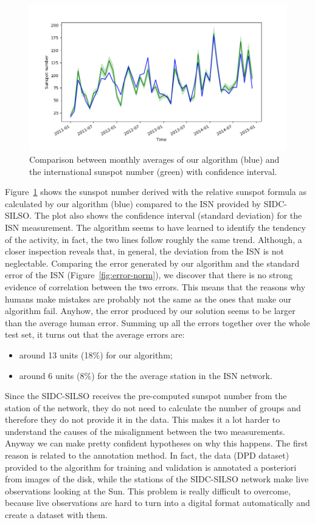 \bigbreak
\begin{figure}[t!]
  \centering
  \captionsetup{justification=centering}
  \includegraphics[width=\textwidth]{./pictures/result-monthly-3}
  \caption{Comparison between monthly averages of our algorithm (blue) and the international sunspot number (green) with confidence interval.}
  \label{fig:result-monthly-3}
\end{figure}
\noindent Figure~\ref{fig:result-monthly-3} shows the sunspot number derived with the relative sunspot formula as calculated by our algorithm (blue) compared to the ISN provided by SIDC-SILSO. The plot also shows the confidence interval (standard deviation) for the ISN measurement. The algorithm seems to have learned to identify the tendency of the activity, in fact, the two lines follow roughly the same trend. Although, a closer inspection reveals that, in general, the deviation from the ISN is not neglectable.
\bigbreak
\noindent Comparing the error generated by our algorithm and the standard error of the ISN (Figure~\ref{fig:error-norm}), we discover that there is no strong evidence of correlation between the two errors. This means that the reasons why humans make mistakes are probably not the same as the ones that make our algorithm fail. Anyhow, the error produced by our solution seems to be larger than the average human error. Summing up all the errors together over the whole test set, it turns out that the average errors are:
\begin{itemize}
  \item around 13 units (18\%) for our algorithm;
  \item around 6 units (8\%) for the the average station in the ISN network.
\end{itemize}
\bigbreak
\noindent Since the SIDC-SILSO receives the pre-computed sunspot number from the station of the network, they do not need to calculate the number of groups and therefore they do not provide it in the data. This makes it a lot harder to understand the causes of the misalignment between the two measurements. Anyway we can make pretty confident hypotheses on why this happens. The first reason is related to the annotation method. In fact, the data (DPD dataset) provided to the algorithm for training and validation is annotated a posteriori from images of the disk, while the stations of the SIDC-SILSO network make live observations looking at the Sun. This problem is really difficult to overcome, because live observations are hard to turn into a digital format automatically and create a dataset with them.
